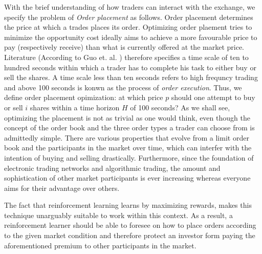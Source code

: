 With the brief understanding of how traders can interact with the exchange, we specify the problem of \textit{Order placement} as follows.
Order placement determines the price at which a trades places its order.
Optimizing order plaement tries to minimize the opportunity cost ideally aims to achieve a more favourable price to pay (respectively receive) than what is currently offered at the market price.
Literature (According to Guo et. al. \cite{guo2013optimal}) therefore specifies a time scale of ten to hundred seconds within which a trader has to complete his task to either buy or sell the shares.
A time scale less than ten seconds refers to high frequncy trading and above 100 seconds is konwn as the process of \textit{order execution}.
Thus, we define order placement opimization: at which price $p$ should one attempt to buy or sell $i$ shares within a time horizon $H$ of 100 seconds?
As we shall see, optimizing the placement is not as trivial as one would think, even though the concept of the order book and the three order types a trader can choose from is admittedly simple.
There are various properties that evolve from a limit order book and the participants in the market over time, which can interfer with the intention of buying and selling drastically.
Furthermore, since the foundation of electronic trading networks and algorithmic trading, the amount and sophistication of other market participants is ever increasing whereas everyone aims for their advantage over others.
%

The fact that reinforcement learning learns by maximizing rewards, makes this technique unarguably suitable to work within this context.
As a result, a reinforcement learner should be able to foresee on how to place orders according to the given market condition and therefore protect an investor form paying the aforementioned premium to other participants in the market.

